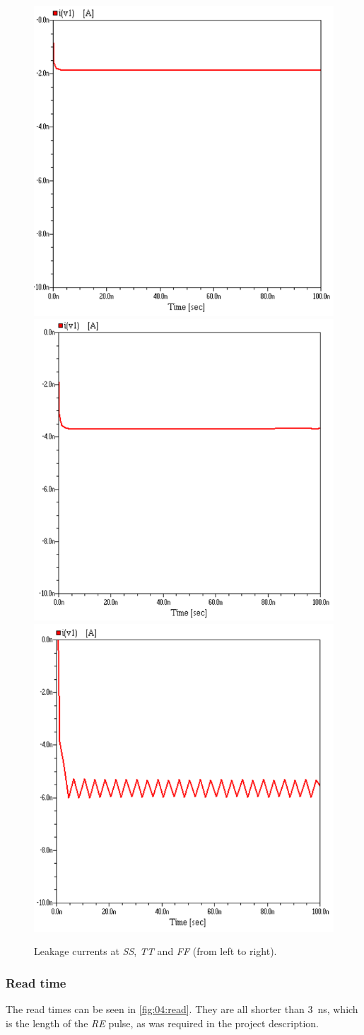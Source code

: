 \begin{figure}[H]
    \centering
    \includegraphics[width=0.3\linewidth]{aimSpice/plots/plotsSS/leak.png}
    \includegraphics[width=0.3\linewidth]{aimSpice/plots/plotsTT/leak.png}
    \includegraphics[width=0.3\linewidth]{aimSpice/plots/plotsFF/leak.png}
    \caption{Leakage currents at \textit{SS}, \textit{TT} and \textit{FF} (from left to right).}
    \label{fig:04:leakage}
\end{figure}

\subsubsection{Read time}
The read times can be seen in \autoref{fig:04:read}. They are all shorter than \SI{3}{ns}, which is the length of the \textit{RE} pulse, as was required in the project description.

